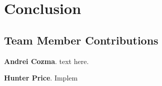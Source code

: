 
\section{Conclusion}
\label{sec:conclusion}






\appendix
\subsection{Team Member Contributions}

\textbf{Andrei Cozma}. text here.


\textbf{Hunter Price}. Implem


